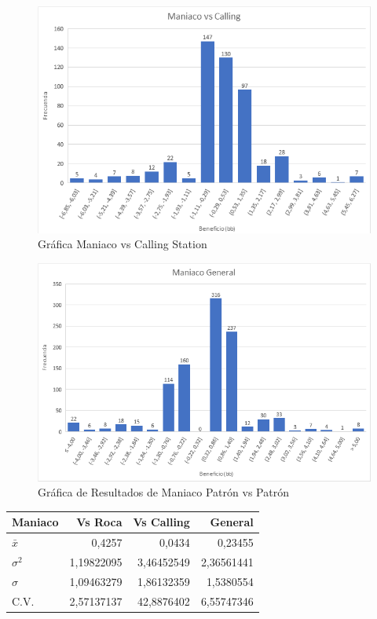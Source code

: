 \begin{figure}[h]
\centering
\includegraphics[width=1\textwidth]{figuras/MvC.png}   
\caption{Gráfica Maniaco vs Calling Station}
\label{fig:MvC}
\end{figure}

\begin{figure}[h]
\centering
\includegraphics[width=1\textwidth]{figuras/MG.png}   
\caption{Gráfica de Resultados de Maniaco Patrón vs Patrón}
\label{fig:MGR}
\end{figure}

\begin{longtable}[c]{lrrr}
\hline
Maniaco & Vs Roca & Vs Calling & General \\ \hline
$\bar{x}$ & 0,4257 & 0,0434 & 0,23455 \\ 
$\sigma^2 $& 1,19822095 & 3,46452549 & 2,36561441 \\ 
$\sigma$ & 1,09463279 & 1,86132359 & 1,5380554 \\
C.V. & 2,57137137 & 42,8876402 & 6,55747346 \\ \hline
\end{longtable}

